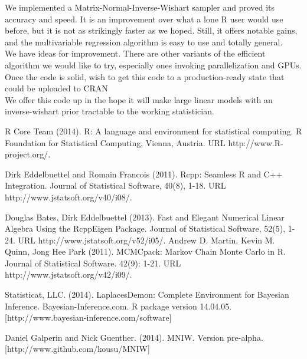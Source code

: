 \documentclass[english]{report}
\begin{document}

We implemented a Matrix-Normal-Inverse-Wishart sampler and proved its accuracy and speed. It is an improvement over what a lone R user would use before, but it is not as strikingly faster as we hoped. Still, it offers notable gains, and the multivariable regression algorithm is easy to use and totally general.\\

We have ideas for improvement. There are other variants of the efficient algorithm we would like to try, especially ones invoking parallelization and GPUs.  Once the code is solid, wish to get this code to a production-ready state that could be uploaded to CRAN \cite{CRAN} \\

We offer this code \cite{MNIW} up in the hope it will make large linear models with an inverse-wishart prior tractable to the working statistician.



\newpage


\begin{thebibliography}{9}

R Core Team (2014). R: A language and environment for statistical computing. R Foundation for
  Statistical Computing, Vienna, Austria. URL http://www.R-project.org/.
  
 Dirk Eddelbuettel and Romain Francois (2011). Rcpp: Seamless R and C++ Integration. Journal of
  Statistical Software, 40(8), 1-18. URL http://www.jstatsoft.org/v40/i08/.

Douglas Bates, Dirk Eddelbuettel (2013). Fast and Elegant Numerical Linear Algebra Using the
  RcppEigen Package. Journal of Statistical Software, 52(5), 1-24. URL
  http://www.jstatsoft.org/v52/i05/.
Andrew D. Martin, Kevin M. Quinn, Jong Hee Park (2011). MCMCpack: Markov Chain Monte Carlo in R.
  Journal of Statistical Software. 42(9): 1-21. URL http://www.jstatsoft.org/v42/i09/. 
 
Statisticat, LLC. (2014). LaplacesDemon: Complete Environment for
  Bayesian Inference. Bayesian-Inference.com. R package version
  14.04.05. [http://www.bayesian-inference.com/software] 
 
Daniel Galperin and Nick Guenther. (2014). MNIW. Version pre-alpha. [http://www.github.com/kousu/MNIW]
 
 \end{thebibliography}
\end{document}

